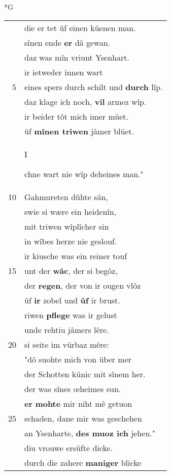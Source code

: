 \documentclass[8pt,a4paper,notitlepage]{article}
\begin{document}
\begin{table}[ht]
\begin{minipage}[t]{0.5\linewidth}
\small
\begin{center}*G
\end{center}
\begin{tabular}{rl}
 & die er tet ûf einen küenen man.\\ 
 & sînen ende \textbf{er} dâ gewan.\\ 
 & daz was mîn vriunt Ysenhart.\\ 
 & ir ietweder innen wart\\ 
5 & eines spers durch schilt und \textbf{durch} lîp.\\ 
 & daz klage ich noch, \textbf{vil} armez wîp.\\ 
 & ir beider tôt mich imer müet.\\ 
 & ûf \textbf{mînen triwen} jâmer blüet.\\ 
 & \begin{large}I\end{large}chne wart nie wîp deheines man."\\ 
10 & Gahmureten dûhte sân,\\ 
 & swie si wære ein heidenîn,\\ 
 & mit triwen wîplîcher sin\\ 
 & in wîbes herze nie geslouf.\\ 
 & ir kiusche was ein reiner touf\\ 
15 & unt der \textbf{wâc}, der si begôz,\\ 
 & der \textbf{regen}, der von ir ougen vlôz\\ 
 & ûf \textbf{ir} zobel und \textbf{ûf} ir brust.\\ 
 & riwen \textbf{pflege} was ir gelust\\ 
 & unde rehtiu jâmers lêre.\\ 
20 & si seite im vürbaz mêre:\\ 
 & "dô suohte mich von über mer\\ 
 & der Schotten künic mit sînem her.\\ 
 & der was sînes œheimes sun.\\ 
 & \textbf{er} \textbf{mohte} mir niht mê getuon\\ 
25 & schaden, dane mir was geschehen\\ 
 & an Ysenharte, \textbf{des muoz ich} jehen."\\ 
 & diu vrouwe ersûfte dicke.\\ 
 & durch die zahere \textbf{maniger} blicke\\ 

\end{tabular}
\end{minipage}
\end{table}
\end{document}
